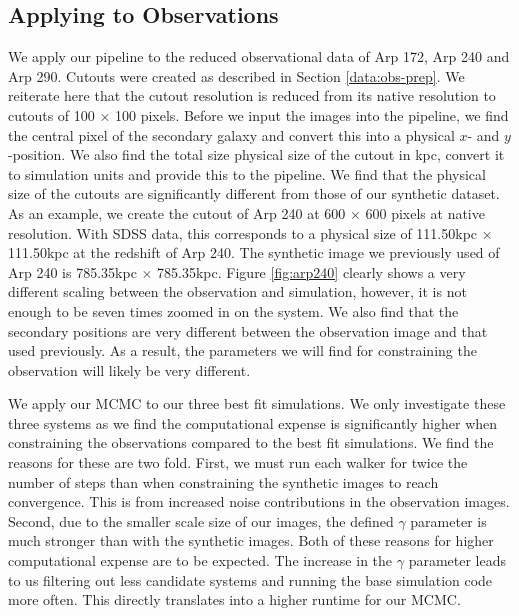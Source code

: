 \subsection{Applying to Observations}
\noindent We apply our pipeline to the reduced observational data of Arp 172, Arp 240 and Arp 290. Cutouts were created as described in Section \ref{data:obs-prep}. We reiterate here that the cutout resolution is reduced from its native resolution to cutouts of 100 $\times$ 100 pixels. Before we input the images into the pipeline, we find the central pixel of the secondary galaxy and convert this into a physical $x$- and $y$-position. We also find the total size physical size of the cutout in kpc, convert it to simulation units and provide this to the pipeline. We find that the physical size of the cutouts are significantly different from those of our synthetic dataset. As an example, we create the cutout of Arp 240 at 600 $\times$ 600 pixels at native resolution. With SDSS data, this corresponds to a physical size of 111.50kpc $\times$ 111.50kpc at the redshift of Arp 240. The synthetic image we previously used of Arp 240 is 785.35kpc $\times$ 785.35kpc. Figure \ref{fig:arp240} clearly shows a very different scaling between the observation and simulation, however, it is not enough to be seven times zoomed in on the system. We also find that the secondary positions are very different between the observation image and that used previously. As a result, the parameters we will find for constraining the observation will likely be very different. 

We apply our MCMC to our three best fit simulations. We only investigate these three systems as we find the computational expense is significantly higher when constraining the observations compared to the best fit simulations. We find the reasons for these are two fold. First, we must run each walker for twice the number of steps than when constraining the synthetic images to reach convergence. This is from increased noise contributions in the observation images. Second, due to the smaller scale size of our images, the defined $\gamma$ parameter is much stronger than with the synthetic images. Both of these reasons for higher computational expense are to be expected. The increase in the $\gamma$ parameter leads to us filtering out less candidate systems and running the base simulation code more often. This directly translates into a higher runtime for our MCMC.

